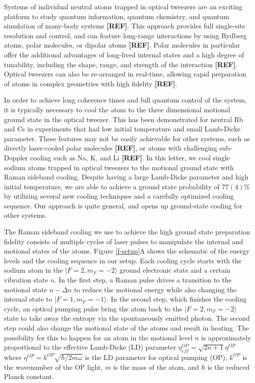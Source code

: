 \documentclass[aps,prl,twocolumn,groupedaddress]{revtex4-1}
\newcommand{\eff}{ef\! f}
\renewcommand{\fxnote}[1]{{\textbf{[#1]}}}
\begin{document}
Systems of individual neutral atoms trapped in optical tweezers are an exciting platform to study
quantum information, quantum chemistry, and quantum simulation of many-body systems \fxnote{REF}.
This approach provides full single-site resolution and control,
and can feature long-range interactions by using Rydberg atoms, polar molecules,
or dipolar atoms \fxnote{REF}.
Polar molecules in particular offer the additional advantages of long-lived internal states
and a high degree of tunability, including the shape, range,
and strength of the interaction \fxnote{REF}.
Optical tweezers can also be re-arranged in real-time,
allowing rapid preparation of atoms in complex geometries with high fidelity \fxnote{REF}.

In order to achieve long coherence times and full quantum control of the system,
it is typically necessary to cool the atom to the
three dimensional motional ground state in the optical tweezer.
This has been demonstrated for neutral Rb\cite{Thompson2013,Kaufman2012} and Cs\cite{Liu2017}
in experiments that had low initial temperature and small Lamb-Dicke parameter.
These features may not be easily achievable for other systems,
such as directly laser-cooled polar molecules \fxnote{REF},
or atoms with challenging sub-Doppler cooling such as Na, K, and Li \fxnote{REF}.
In this letter, we cool single sodium atoms trapped in optical tweezers to
the motional ground state with Raman sideband cooling.
Despite having a large Lamb-Dicke parameter and high initial temperature,
we are able to achieve a ground state probability of $77(4)\%$
by utilizing several new cooling techniques and a carefully optimized cooling sequence.
Our approach is quite general, and opens up ground-state cooling for other systems.

The Raman sideband cooling we use to achieve the high ground state preparation fidelity
consists of multiple cycles of laser pulses to manipulate the internal and
motional states of the atoms.
Figure \ref{f-setup}A shows the schematic of the energy levels and the cooling sequence
in our setup.
Each cooling cycle starts with the sodium atom in the $|F=2, m_F=-2\rangle$
ground electronic state and a certain vibration state $n$.
In the first step, a Raman pulse drives a transition to the motional state $n-\Delta n$
to reduce the motional energy while also changing the internal state to $|F=1, m_F=-1\rangle$.
In the second step, which finishes the cooling cycle,
an optical pumping pulse bring the atom back to the $|F=2, m_F=-2\rangle$ state to take away
the entropy via the spontaneously emitted photon.
The second step could also change the motional state of the atoms and result in heating.
The possibility for this to happen for an atom in the motional level $n$
is approximately proportional to the effective Lamb-Dicke (LD) parameter
$\eta^{OP}_{\eff}=\sqrt{2n+1}\eta^{OP}$ where $\eta^{OP}=k^{OP}\sqrt{\hbar/2m\omega}$
is the LD parameter for optical pumping (OP), $k^{OP}$ is the wavenumber of the OP light, $m$ is the mass of the atom, and $\hbar$ is the reduced Planck constant.
\end{document}
